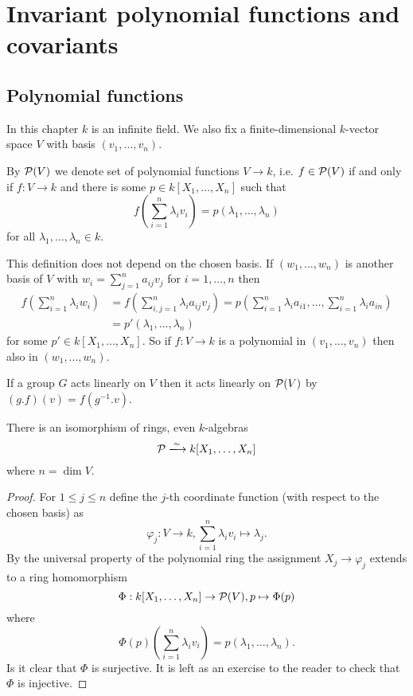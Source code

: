 \chapter{Invariant polynomial functions and covariants}


\section{Polynomial functions}


In this chapter $k$ is an infinite field. We also fix a finite-dimensional $k$-vector space $V$ with basis $(v_1, \ldots, v_n)$.


\begin{defi}
 By $\mathcal{P}(V)$ we denote set of polynomial functions $V \to k$, i.e. $f \in \mathcal{P}(V)$ if and only if $f : V \to k$ and there is some $p \in k[X_1, \ldots, X_n]$ such that
 \[
  f\left( \sum_{i=1}^n \lambda_i v_i \right) = p(\lambda_1, \ldots, \lambda_n)
 \]
 for all $\lambda_1, \ldots, \lambda_n \in k$.
\end{defi}


This definition does not depend on the chosen basis. If $(w_1, \ldots, w_n)$ is another basis of $V$ with $w_i = \sum_{j=1}^n a_{ij} v_j$ for $i=1,\ldots,n$ then
\begin{align*}
 f\left( \sum_{i=1}^n \lambda_i w_i \right)
 &= f\left( \sum_{i,j=1}^n \lambda_i a_{ij} v_j \right)
 = p\left( \sum_{i=1}^n \lambda_i a_{i1}, \ldots, \sum_{i=1}^n \lambda_{i} a_{in} \right)\\
 &= p'(\lambda_1, \ldots, \lambda_n)
\end{align*}
for some $p' \in k[X_1, \ldots, X_n]$. So if $f : V \to k$ is a polynomial in $(v_1, \ldots, v_n)$ then also in $(w_1, \ldots, w_n)$.


\begin{rem}
 If a group $G$ acts linearly on $V$ then it acts linearly on $\mathcal{P}(V)$ by $(g.f)(v) = f\left(g^{-1}.v\right)$.
\end{rem}


\begin{lem}
 There is an isomorphism of rings, even $k$-algebras
 \[
  \mc{P} \xlongrightarrow{\sim} k[X_1, \ldots, X_n]
 \]
 where $n = \dim V$.
\end{lem}
\begin{proof}
 For $1 \leq j \leq n$ define the $j$-th coordinate function (with respect to the chosen basis) as
 \[
  \varphi_j : V \to k, \sum_{i=1}^n \lambda_i v_i \mapsto \lambda_j.
 \]
 By the universal property of the polynomial ring the assignment $X_j \to \varphi_j$ extends to a ring homomorphism
 \[
  \Phi: k[X_1, \ldots, X_n] \to \mathcal{P}(V), p \mapsto \Phi(p)
 \]
 where
 \[
  \Phi(p)\left(\sum_{i=1}^n \lambda_i v_i\right) = p(\lambda_1, \ldots, \lambda_n).
 \]
 Is it clear that $\Phi$ is surjective. It is left as an exercise to the reader to check that $\Phi$ is injective.
\end{proof}



